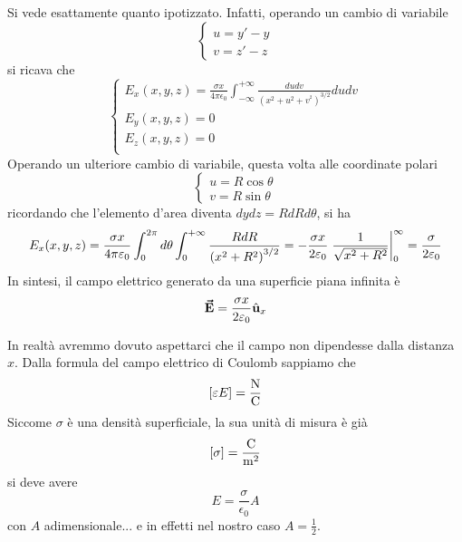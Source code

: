 Si vede esattamente quanto ipotizzato. Infatti, operando un cambio di variabile
\begin{equation*}
	\begin{cases}
		u=y'-y\\
		v=z'-z
	\end{cases}
\end{equation*}
si ricava che
\begin{equation*}
	\begin{cases}
		E_x(x,y,z)=\frac{\sigma x}{4\pi\epsilon_0}\int_{-\infty}^{+\infty}\frac{dudv}{\left(x^2+u^2+v^^2\right)^{3/2}}dudv\\
		E_y(x,y,z)=0\\
		E_z(x,y,z)=0\\
	\end{cases}
\end{equation*}
Operando un ulteriore cambio di variabile, questa volta alle coordinate polari
\begin{equation*}
		\begin{cases}
		u=R\cos\theta\\
		v=R\sin\theta
	\end{cases}
\end{equation*}
ricordando che l'elemento d'area diventa $dydz=RdRd\theta$, si ha
\begin{equation*}
	E_x(x,y,z)=\frac{\sigma x}{4\pi\epsilon_0}\int_{0}^{2\pi}d\theta\int_{0}^{+\infty}\frac{RdR}{\left(x^2+R^2\right)^{3/2}}=-\frac{\sigma x}{2\epsilon_0}\eval{\frac{1}{\sqrt{x^2+R^2}}}_{0}^{\infty}=\frac{\sigma}{2\epsilon_0}
\end{equation*}
In sintesi, il campo elettrico generato da una superficie piana infinita è
\begin{equation}
	\vb*{\va{E}}=\frac{\sigma x}{2\varepsilon_0}\hat{\mathbf{u}}_x
\end{equation}
\begin{observe}
	In realtà avremmo dovuto aspettarci che il campo non dipendesse dalla distanza $x$. Dalla formula del campo elettrico di Coulomb sappiamo che
	\begin{equation*}
		\left[\epsilon E\right]=\unit[per-mode = fraction]{\newton\per\coulomb}
	\end{equation*}
	Siccome $\sigma$ è una densità superficiale, la sua unità di misura è già
	\begin{equation*}
		\left[\sigma\right]=\unit[per-mode = fraction]{\coulomb\per\square\meter}
	\end{equation*}
	si deve avere
	\begin{equation*}
		E=\frac{\sigma}{\epsilon_0}A
	\end{equation*}
con $A$ adimensionale... e in effetti nel nostro caso $A=\frac{1}{2}$.
\end{observe}
